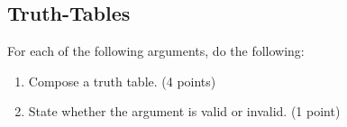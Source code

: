 \documentclass{exam}
\begin{document}
\begin{questions}
\begin{parts}
\end{parts}

\subsection*{Truth-Tables}

\question For each of the following arguments, do the following:
\begin{enumerate}
\item Compose a truth table. (4 points)
\item State whether the argument is valid or invalid. (1 point)
\end{enumerate}
\end{questions}
\end{document}
